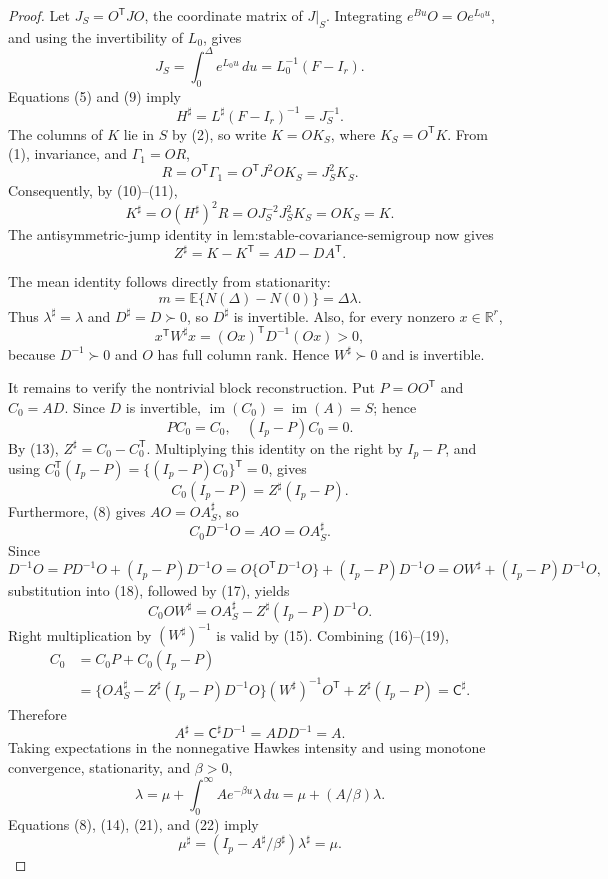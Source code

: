 \documentclass{article}
\begin{document}
\begin{proof}
Let \(J_S=O^{\mathsf T}JO\), the coordinate matrix of \(J|_S\).  Integrating \(e^{Bu}O=Oe^{L_0u}\), and using the invertibility of \(L_0\), gives
\[
 J_S=\int_0^\Delta e^{L_0u}\,du=L_0^{-1}(F-I_r).
\tag{9}
\]
Equations (5) and (9) imply
\[
 H^\sharp=L^\sharp(F-I_r)^{-1}=J_S^{-1}.
\tag{10}
\]
The columns of \(K\) lie in \(S\) by (2), so write \(K=OK_S\), where \(K_S=O^{\mathsf T}K\).  From (1), invariance, and \(\Gamma_1=OR\),
\[
 R=O^{\mathsf T}\Gamma_1=O^{\mathsf T}J^2OK_S=J_S^2K_S.
\tag{11}
\]
Consequently, by (10)--(11),
\[
 K^\sharp=O(H^\sharp)^2R=OJ_S^{-2}J_S^2K_S=OK_S=K.
\tag{12}
\]
The antisymmetric-jump identity in \(\text{lem:stable-covariance-semigroup}\) now gives
\[
 Z^\sharp=K-K^{\mathsf T}=AD-DA^{\mathsf T}.
\tag{13}
\]

The mean identity follows directly from stationarity:
\[
 m=\mathbb E\{N(\Delta)-N(0)\}=\Delta\lambda.
\tag{14}
\]
Thus \(\lambda^\sharp=\lambda\) and \(D^\sharp=D\succ0\), so \(D^\sharp\) is invertible.  Also, for every nonzero \(x\in\mathbb R^r\),
\[
 x^{\mathsf T}W^\sharp x
 =(Ox)^{\mathsf T}D^{-1}(Ox)>0,
\tag{15}
\]
because \(D^{-1}\succ0\) and \(O\) has full column rank.  Hence \(W^\sharp\succ0\) and is invertible.

It remains to verify the nontrivial block reconstruction.  Put \(P=OO^{\mathsf T}\) and \(C_0=AD\).  Since \(D\) is invertible, \(\operatorname{im}(C_0)=\operatorname{im}(A)=S\); hence
\[
 PC_0=C_0,\quad (I_p-P)C_0=0.
\tag{16}
\]
By (13), \(Z^\sharp=C_0-C_0^{\mathsf T}\).  Multiplying this identity on the right by \(I_p-P\), and using \(C_0^{\mathsf T}(I_p-P)=\{(I_p-P)C_0\}^{\mathsf T}=0\), gives
\[
 C_0(I_p-P)=Z^\sharp(I_p-P).
\tag{17}
\]
Furthermore, (8) gives \(AO=OA_S^\sharp\), so
\[
 C_0D^{-1}O=AO=OA_S^\sharp.
\tag{18}
\]
Since
\[
 D^{-1}O=PD^{-1}O+(I_p-P)D^{-1}O
 =O\{O^{\mathsf T}D^{-1}O\}+(I_p-P)D^{-1}O
 =OW^\sharp+(I_p-P)D^{-1}O,
\]
substitution into (18), followed by (17), yields
\[
 C_0O W^\sharp
 =OA_S^\sharp-Z^\sharp(I_p-P)D^{-1}O.
\tag{19}
\]
Right multiplication by \((W^\sharp)^{-1}\) is valid by (15).  Combining (16)--(19),
\[
 \begin{aligned}
 C_0
 &=C_0P+C_0(I_p-P)\\
 &=\{OA_S^\sharp-Z^\sharp(I_p-P)D^{-1}O\}
   (W^\sharp)^{-1}O^{\mathsf T}+Z^\sharp(I_p-P)
 =\mathsf C^\sharp.
 \end{aligned}
\tag{20}
\]
Therefore
\[
 A^\sharp=\mathsf C^\sharp D^{-1}=AD D^{-1}=A.
\tag{21}
\]
Taking expectations in the nonnegative Hawkes intensity and using monotone convergence, stationarity, and \(\beta>0\),
\[
 \lambda=\mu+\int_0^\infty Ae^{-\beta u}\lambda\,du
 =\mu+(A/\beta)\lambda.
\tag{22}
\]
Equations (8), (14), (21), and (22) imply
\[
 \mu^\sharp=(I_p-A^\sharp/\beta^\sharp)\lambda^\sharp=\mu.
\tag{23}
\]


\end{proof}
\end{document}
